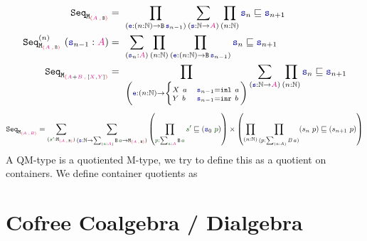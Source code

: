 \documentclass[twoside,11pt,openright]{report}
\theoremstyle{plain} %
\theoremstyle{definition}
\theoremstyle{remark}
\newcommand*{\term}[1]{\textcolor{green!30!black}{#1}} %
\newcommand*{\type}[1]{\textcolor{magenta!90!black}{#1}}
\newcommand*{\containerpair}[2]{\ensuremath{\colorlet{savedleftcolor}{.}\color{red}\left(\color{savedleftcolor}#1\,\textcolor{red}{\mathbf{,}}\,#2\color{red}\right)\color{savedleftcolor}}}
\newcommand*{\function}[1]{\textcolor{blue!60!black}{\ensuremath{\mathtt{#1}}}}
\newcommand*{\typeformer}[1]{\ensuremath{\mathtt{#1}}}
\begin{document}
\begin{align}
  \typeformer{Seq}_{\typeformer{M}_{\containerpair{\type{A}}{\typeformer{B}}}} &=~\prod_{(\function{e} : (n : \mathbb{N}) \rightarrow \typeformer{B}\,\function{s}_{n-1})}\sum_{(\function{s} : \mathbb{N} \rightarrow \type{A})}\prod_{(n : \mathbb{N})} \function{s}_n \sqsubseteq \function{s}_{n+1} \\
  \typeformer{Seq}_{\typeformer{M}_{\containerpair{\type{A}}{\typeformer{B}}}}^{(n)}~(\function{s}_{n-1} : \type{A}) &=~\sum_{(\function{s}_n : \type{A})} \prod_{(n : \mathbb{N})} \prod_{(\function{e} : (n : \mathbb{N}) \rightarrow \typeformer{B}\,\function{s}_{n-1})} \function{s}_n \sqsubseteq \function{s}_{n+1} \\
  \typeformer{Seq}_{\typeformer{M}_{\containerpair{\type{A} + \type{B}}{[\type{X} , \type{Y}]}}} &=~\prod_{\left(\function{e} : (n : \mathbb{N}) \rightarrow {\begin{cases}  {\scriptstyle  X~a} & {\scriptstyle  \function{s}_{n-1} = \mathtt{inl}~a} \\[-2mm] {\scriptstyle  Y~b} & {\scriptstyle  \function{s}_{n-1} = \mathtt{inr}~b} \end{cases}}\right)}\sum_{(\function{s} : \mathbb{N} \rightarrow \type{A})}\prod_{(n : \mathbb{N})} \function{s}_n \sqsubseteq \function{s}_{n+1}
\end{align}
\begin{equation}
  \typeformer{Seq}_{\typeformer{M}_{\containerpair{\type{A}}{\type{B}}}} = \sum_{(\term{s'} : \typeformer{M}_{\containerpair{\type{A}}{\typeformer{B}}})}  \sum_{(\function{s} : \mathbb{N} \rightarrow \sum_{(\term{a} : \type{A})} \typeformer{B}\,\term{a} \rightarrow \typeformer{M}_{\containerpair{\type{A}}{\typeformer{B}}})} \left(\prod_{\term{p} : \sum_{\term{a} : \type{A}} \typeformer{B}\,\term{a}} \term{s'} \sqsubseteq (\function{s}_0~\term{p})\right) \times \left( \prod_{(n : \mathbb{N})} \prod_{(p : \sum_{(a : A)} B\,a)} (s_n~p) \sqsubseteq (s_{n+1}~p) \right)
\end{equation}
A QM-type is a quotiented M-type, we try to define this as a quotient on containers. We define container quotients as

\section{Cofree Coalgebra / Dialgebra}

\end{document}

